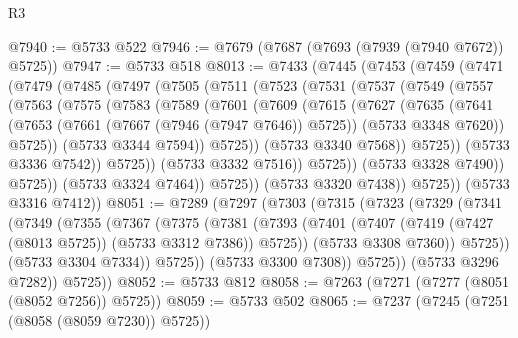 \begin{lexlean}{R3}
\begin{coremodule}
@7940 := @5733 @522
@7946 := @7679 (@7687 (@7693 (@7939 (@7940 @7672)) @5725))
@7947 := @5733 @518
@8013 := @7433
    (@7445
      (@7453
        (@7459
          (@7471
            (@7479
              (@7485
                (@7497
                  (@7505
                    (@7511
                      (@7523
                        (@7531
                          (@7537
                            (@7549
                              (@7557
                                (@7563
                                  (@7575
                                    (@7583
                                      (@7589
                                        (@7601
                                          (@7609
                                            (@7615
                                              (@7627
                                                (@7635
                                                  (@7641
                                                    (@7653
                                                      (@7661 (@7667 (@7946 (@7947 @7646)) @5725))
                                                      (@5733 @3348 @7620))
                                                    @5725))
                                                (@5733 @3344 @7594))
                                              @5725))
                                          (@5733 @3340 @7568))
                                        @5725))
                                    (@5733 @3336 @7542))
                                  @5725))
                              (@5733 @3332 @7516))
                            @5725))
                        (@5733 @3328 @7490))
                      @5725))
                  (@5733 @3324 @7464))
                @5725))
            (@5733 @3320 @7438))
          @5725))
      (@5733 @3316 @7412))
@8051 := @7289
    (@7297
      (@7303
        (@7315
          (@7323
            (@7329
              (@7341
                (@7349
                  (@7355
                    (@7367
                      (@7375
                        (@7381
                          (@7393
                            (@7401 (@7407 (@7419 (@7427 (@8013 @5725)) (@5733 @3312 @7386)) @5725))
                            (@5733 @3308 @7360))
                          @5725))
                      (@5733 @3304 @7334))
                    @5725))
                (@5733 @3300 @7308))
              @5725))
          (@5733 @3296 @7282))
        @5725))
@8052 := @5733 @812
@8058 := @7263 (@7271 (@7277 (@8051 (@8052 @7256)) @5725))
@8059 := @5733 @502
@8065 := @7237 (@7245 (@7251 (@8058 (@8059 @7230)) @5725))

\end{coremodule}
\end{lexlean}
